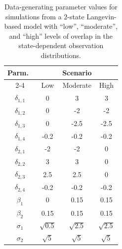\documentclass[12pt]{article}\usepackage[]{graphicx}\usepackage[]{xcolor}
\begin{document}
\begin{table}
\caption{Data-generating parameter values for simulations from a 2-state Langevin-based model with ``low'', ``moderate'', and ``high'' levels of overlap in the state-dependent observation distributions.\label{tab:lang}}
\centering
\begin{tabular}[t]{cccc}
\hline
Parm.\ & \multicolumn{3}{c}{\textbf{Scenario}}  \\
\cline{2-4}
 & Low & Moderate & High \\
\hline
$\delta_{1,1}$ & 0 & 3 & 3 \\
$\delta_{1,2}$ & 0 & -2 & -2 \\
$\delta_{1,3}$ & 0 & -2.5 & -2.5 \\
$\delta_{1,4}$ & -0.2 & -0.2 & -0.2 \\
$\delta_{2,1}$ & -2 & -2 & 0 \\
$\delta_{2,2}$ & 3 & 3 & 0 \\
$\delta_{2,3}$ & 2.5 & 2.5 & 0 \\
$\delta_{2,4}$ & -0.2 & -0.2 & -0.2 \\
$\beta_1$ & 0 & 0.15 & 0.15 \\
$\beta_2$ & 0.15 & 0.15 & 0.15 \\
$\sigma_1$ & $\sqrt{0.5}$ & $\sqrt{2.5}$ & $\sqrt{2.5}$ \\
$\sigma_2$ & $\sqrt{5}$ & $\sqrt{5}$ & $\sqrt{5}$ \\
\hline
\end{tabular}
\end{table}
\end{document}

